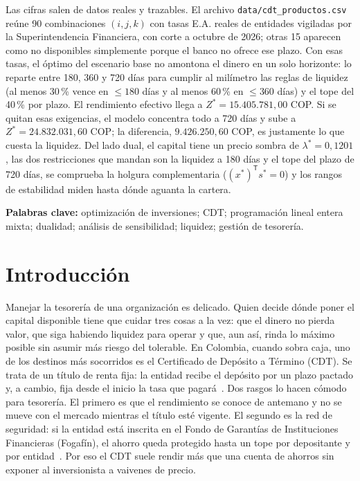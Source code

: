 \documentclass[11pt,a4paper]{article}
\newcommand{\T}{\mathsf{T}}
\begin{document}
Las cifras salen de datos reales y trazables. El archivo \texttt{data/cdt\_productos.csv}
reúne 90 combinaciones $(i, j, k)$ con tasas E.A. reales de entidades vigiladas por la
Superintendencia Financiera, con corte a octubre de 2026; otras 15 aparecen como no
disponibles simplemente porque el banco no ofrece ese plazo. Con esas tasas, el óptimo del
escenario base no amontona el dinero en un solo horizonte: lo reparte entre 180, 360 y 720
días para cumplir al milímetro las reglas de liquidez (al menos 30\,\% vence en $\le 180$
días y al menos 60\,\% en $\le 360$ días) y el tope del 40\,\% por plazo. El rendimiento
efectivo llega a $Z^* = 15.405.781{,}00$ COP. Si se quitan esas exigencias, el modelo
concentra todo a 720 días y sube a $Z^* = 24.832.031{,}60$ COP; la diferencia,
$9.426.250{,}60$ COP, es justamente lo que cuesta la liquidez. Del lado dual, el capital
tiene un precio sombra de $\lambda^* = 0{,}1201$, las dos restricciones que mandan son la
liquidez a 180 días y el tope del plazo de 720 días, se comprueba la holgura complementaria
($(x^*)^{\T} s^* = 0$) y los rangos de estabilidad miden hasta dónde aguanta la cartera.

\medskip
\noindent\textbf{Palabras clave:} optimización de inversiones; CDT; programación lineal entera
mixta; dualidad; análisis de sensibilidad; liquidez; gestión de tesorería.

\section{Introducción}

Manejar la tesorería de una organización es delicado. Quien decide dónde poner el
capital disponible tiene que cuidar tres cosas a la vez: que el dinero no pierda valor, que
siga habiendo liquidez para operar y que, aun así, rinda lo máximo posible sin asumir más
riesgo del tolerable. En Colombia, cuando sobra caja, uno de los destinos más socorridos es
el Certificado de Depósito a Término (CDT). Se trata de un título de renta fija: la entidad
recibe el depósito por un plazo pactado y, a cambio, fija desde el inicio la tasa que
pagará~\citep{banrep_cdt}. Dos rasgos lo hacen cómodo para tesorería. El primero es que el
rendimiento se conoce de antemano y no se mueve con el mercado mientras el título esté vigente.
El segundo es la red de seguridad: si la entidad está inscrita en el Fondo de Garantías de
Instituciones Financieras (Fogafín), el ahorro queda protegido hasta un tope por depositante
y por entidad~\citep{fogafin_seguro}. Por eso el CDT suele rendir más que una cuenta de ahorros
sin exponer al inversionista a vaivenes de precio.
\end{document}
